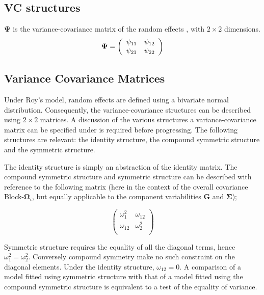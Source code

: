 \documentclass[12pt, a4paper]{report}
\theoremstyle{plain}
\theoremstyle{definition}
\theoremstyle{remark}
\begin{document}
		\subsection{VC structures}
		$\boldsymbol{\Psi}$ is the variance-covariance matrix of the random effects ,
		with $2 \times 2$ dimensions.
		\begin{equation}
		\boldsymbol{\Psi} =
		\left(%
		\begin{array}{c c}
		\psi_{11} & \psi_{12}  \\
		\psi_{21} & \psi_{22}  \\
		\end{array}%
		\right)
		\end{equation}
		

		
	
	
	
	\newpage
	\subsection{Variance Covariance Matrices }
	
	Under Roy's model, random effects are defined using a bivariate normal distribution. Consequently, the variance-covariance structures can be described using $2 \times 2$  matrices. A discussion of the various structures a variance-covariance matrix can be specified under is required before progressing. The following structures are relevant: the identity structure, the compound symmetric structure and the symmetric structure.
	
	The identity structure is simply an abstraction of the identity matrix. The compound symmetric structure and symmetric structure can be described with reference to the following matrix (here in the context of the overall covariance Block-$\boldsymbol{\Omega}_i$, but equally applicable to the component variabilities $\boldsymbol{G}$ and $\boldsymbol{\Sigma}$);
	
	\[\left( \begin{array}{cc}
	\omega^2_1  & \omega_{12} \\
	\omega_{12} & \omega^2_2 \\
	\end{array}\right) \]
	
	Symmetric structure requires the equality of all the diagonal terms, hence $\omega^2_1 = \omega^2_2$. Conversely compound symmetry make no such constraint on the diagonal elements. Under the identity structure, $\omega_{12} = 0$.
	A comparison of a model fitted using symmetric structure with that of a model fitted using the compound symmetric structure is equivalent to a test of the equality of variance.
	
\end{document}

